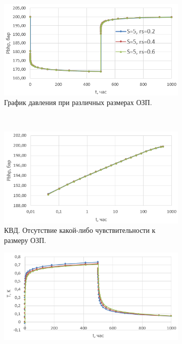 \begin{figure}[H]
	\begin{subfigure}[b]{0.5\textwidth}
	\centering
	\includegraphics[width=1\textwidth]{pic/pres_sens.png}
	\caption{График давления при различных размерах ОЗП.}
	\label{pic:pres_sens}
	\end{subfigure}
~
	\begin{subfigure}[b]{0.5\textwidth}
		\centering
		\includegraphics[width=1\textwidth]{pic/pres_sens1.png}
		\caption{КВД. Отсутствие какой-либо чувствительности к размеру ОЗП.}
		\label{pic:pres_sens1}
	\end{subfigure}
	\begin{subfigure}[b]{0.5\textwidth}
		\centering
		\includegraphics[width=1\textwidth]{pic/temp_sens.png}

\end{subfigure}
\end{figure}
